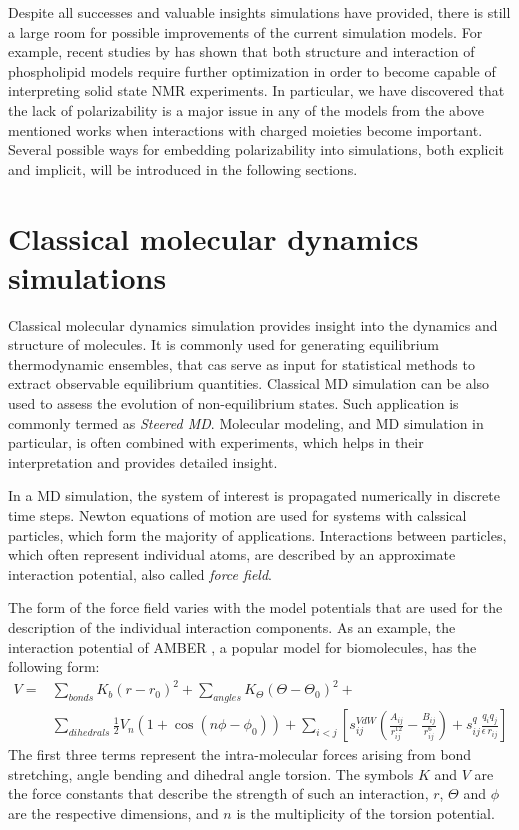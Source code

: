 Despite all successes and valuable insights simulations have provided, 
there is still a large room for possible improvements of the current simulation models. 
For example, recent studies by \citet{botan15, catte16} has shown 
that both structure and interaction of phospholipid models require further optimization 
in order to become capable of interpreting solid state NMR experiments. 
In particular, we have discovered that 
the lack of polarizability is a major issue in any of the models 
from the above mentioned works \citep{botan15, catte16}
when interactions with charged moieties become important. 
Several possible ways for embedding polarizability into simulations, both explicit and implicit, 
will be introduced in the following sections. 





\section{Classical molecular dynamics simulations}
\label{section:md}

Classical molecular dynamics simulation provides insight into the dynamics and structure of molecules. 
It is commonly used for generating equilibrium thermodynamic ensembles,
that cas serve as input for statistical methods to extract observable equilibrium quantities. 
Classical MD simulation can be also used to assess the evolution of non-equilibrium states.
Such application is commonly termed as \emph{Steered MD}. 
Molecular modeling, and MD simulation in particular, 
is often combined with experiments,
which helps in their interpretation and provides detailed insight. 

In a MD simulation, the system of interest is propagated numerically in discrete time steps.
Newton equations of motion are used for systems with calssical particles, which form the majority of applications.
Interactions between particles, which often represent individual atoms, 
are described by an approximate interaction potential, also called \emph{force field}. 

The form of the force field varies with the model potentials that are used for the description of the individual interaction components. 
As an example, the interaction potential of AMBER \citep{ferrer13}, a popular model for biomolecules, has the following form:
\begin{eqnarray}  \label{eq:amber}
  V = & \displaystyle \sum _{bonds} K_b (r-r_{0})^2 + \sum _{angles} K_\Theta (\Theta-\Theta_{0})^2 + \\ \nonumber
      & \displaystyle \sum _{dihedrals} \frac{1}{2} V_n (1+\cos(n\phi -\phi_0)) + \sum _{i<j} \left [ s_{ij} ^{VdW} \left( \frac{A_{ij}}{r_{ij} ^{12}} - \frac{B_{ij}}{r_{ij} ^6} \right ) + s_{ij}^q \frac{q_i q_j}{\epsilon \, r_{ij}} \right ]
\end{eqnarray}
The first three terms represent the intra-molecular forces arising from bond stretching, angle bending and dihedral angle torsion. 
The symbols $K$ and $V$ are the force constants that describe the strength of such an interaction,
$r$, $\Theta$ and $\phi$ are the respective dimensions,
and $n$ is the multiplicity of the torsion potential. 

